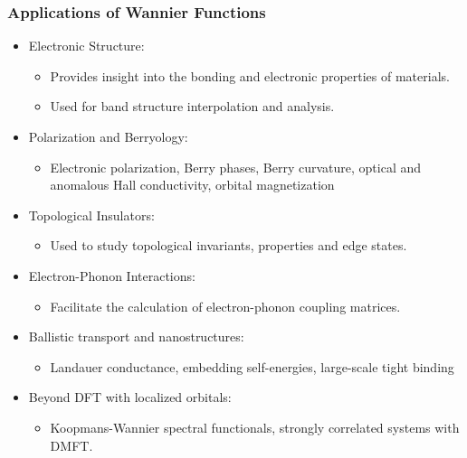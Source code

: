 \documentclass{CustomBeamer}
\begin{document}
    \begin{frame}
    \frametitle{Applications of Wannier Functions}
    \begin{itemize}
        \item Electronic Structure:
        \begin{itemize}
            \item Provides insight into the bonding and electronic properties of materials.
            \item Used for band structure interpolation and analysis.
        \end{itemize}
        \item Polarization and Berryology:
        \begin{itemize}
            \item Electronic polarization, Berry phases, Berry curvature, optical and
            anomalous Hall conductivity,
            orbital magnetization
        \end{itemize}
        \item Topological Insulators:
        \begin{itemize}
            \item Used to study topological invariants, properties and edge states.
        \end{itemize}
        \item Electron-Phonon Interactions:
        \begin{itemize}
            \item Facilitate the calculation of electron-phonon coupling matrices.
        \end{itemize}
        \item Ballistic transport and nanostructures:
        \begin{itemize}
            \item Landauer conductance,
            embedding self-energies,
            large-scale tight binding
        \end{itemize}
        \item Beyond DFT with localized orbitals:
        \begin{itemize}
            \item  Koopmans-Wannier spectral
            functionals, strongly correlated 
            systems with DMFT.
        \end{itemize}
    \end{itemize}
    \end{frame}
    
\end{document}

